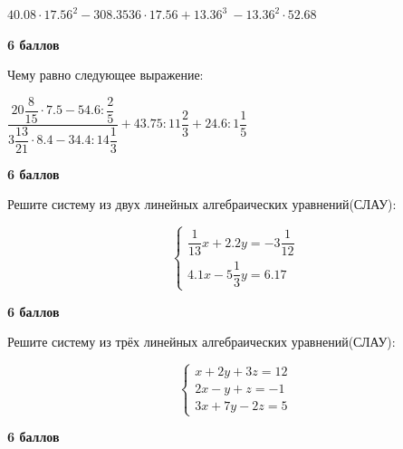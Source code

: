 $40.08\cdot17.56^{2}-308.3536\cdot17.56+13.36^{3}\ -13.36^{2}\cdot52.68$

\begin{flushright} \textbf{6 баллов}\\ 
\end{flushright}

 Чему равно следующее выражение: 

$\dfrac{20\dfrac{8}{15}\cdot7.5-54.6:\dfrac{2}{5}}{3\dfrac{13}{21}\cdot8.4-34.4:14\dfrac{1}{3}}+43.75:11\dfrac{2}{3}+24.6:1\dfrac{1}{5}$

\begin{flushright} \textbf{6 баллов}\\ 
\end{flushright}

\hspace{3mm}

 Решите систему из двух линейных алгебраических уравнений(СЛАУ):

\begin{equation*}
 \begin{cases}
   \dfrac{1}{13}x + 2.2y = -3\dfrac{1}{12}
   \\
   4.1x - 5\dfrac{1}{3}y = 6.17
 \end{cases}
\end{equation*}

\begin{flushright} \textbf{6 баллов}\\ 
\end{flushright}

\hspace{3mm}

 Решите систему из трёх линейных алгебраических уравнений(СЛАУ):

\begin{equation*}
 \begin{cases}
   x + 2y + 3z = 12
   \\
   2x - y + z = -1
   \\
   3x + 7y - 2z = 5
   
 \end{cases}
\end{equation*}

\begin{flushright} \textbf{6 баллов}\\ 
\end{flushright}

\hspace{3mm}


